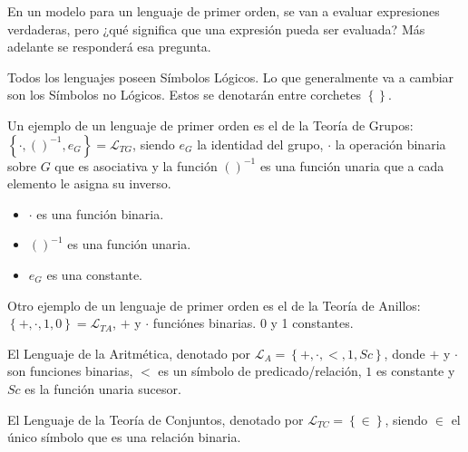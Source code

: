 \documentclass[12pt]{report}
\theoremstyle{largebreak}
\begin{document}
    \begin{obs}
        En un modelo para un lenguaje de primer orden, se van a evaluar expresiones verdaderas, pero ¿qué significa que una expresión pueda ser evaluada? Más adelante se responderá esa pregunta.
    \end{obs}

    \begin{obs}
        Todos los lenguajes poseen Símbolos Lógicos. Lo que generalmente va a cambiar son los Símbolos no Lógicos. Estos se denotarán entre corchetes $\left\{\right\}$.
    \end{obs}

    \begin{exa}
        Un ejemplo de un lenguaje de primer orden es el de la Teoría de Grupos: $\left\{\cdot,()^{-1},e_G \right\}=\mathcal{L}_{TG}$, siendo $e_G$ la identidad del grupo, $\cdot$ la operación binaria sobre $G$ que es asociativa y la función $()^{-1}$ es una función unaria que a cada elemento le asigna su inverso.
        \begin{itemize}
            \item $\cdot$ es una función binaria.
            \item $()^{-1}$ es una función unaria.
            \item $e_G$ es una constante.
        \end{itemize}
    \end{exa}

    \begin{exa}
        Otro ejemplo de un lenguaje de primer orden es el de la Teoría de Anillos: $\left\{+,\cdot,1,0 \right\}=\mathcal{L}_{TA}$, $+$ y $\cdot$ funciónes binarias. 0 y 1 constantes.
    \end{exa}
    
    \begin{exa}
        El Lenguaje de la Aritmética, denotado por $\mathcal{L}_A=\left\{+,\cdot,<,1,Sc \right\}$, donde $+$ y $\cdot$ son funciones binarias, $<$ es un símbolo de predicado/relación, $1$ es constante y $Sc$ es la función unaria sucesor.
    \end{exa}

    \begin{exa}
        El Lenguaje de la Teoría de Conjuntos, denotado por $\mathcal{L}_{TC}=\left\{\in\right\}$, siendo $\in$ el único símbolo que es una relación binaria.
    \end{exa}
\end{document}
